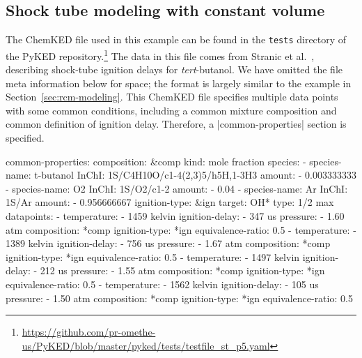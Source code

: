 \documentclass[12pt]{ijck}
\newcommand\ck{ChemKED}
\newcommand\pk{PyKED}
\begin{document}
\subsection{Shock tube modeling with constant volume}\label{sec:shock-tube}

The \ck{} file used in this example can be found in the \texttt{tests} directory of the \pk{}
repository.\footnote{\url{https://github.com/pr-omethe-us/PyKED/blob/master/pyked/tests/testfile_st_p5.yaml}}
The data in this file comes from Stranic et al.~\autocite{Stranic:2012}, describing
shock-tube ignition delays for \textit{tert}-butanol. We have omitted the file
meta information below for space; the format is largely similar to the example in Section~\ref{sec:rcm-modeling}.
%
This \ck{} file specifies multiple data points with some common
conditions, including a common mixture composition and common definition of
ignition delay. Therefore, a \yabox|common-properties| section is specified.
%
\begin{yamlbox}
common-properties:
  composition: &comp
    kind: mole fraction
    species:
      - species-name: t-butanol
        InChI: 1S/C4H10O/c1-4(2,3)5/h5H,1-3H3
        amount:
          - 0.003333333
      - species-name: O2
        InChI:  1S/O2/c1-2
        amount:
          - 0.04
      - species-name: Ar
        InChI:  1S/Ar
        amount:
          - 0.956666667
  ignition-type: &ign
    target: OH*
    type: 1/2 max
datapoints:
  - temperature:
      - 1459 kelvin
    ignition-delay:
      - 347 us
    pressure:
      - 1.60 atm
    composition: *comp
    ignition-type: *ign
    equivalence-ratio: 0.5
  - temperature:
      - 1389 kelvin
    ignition-delay:
      - 756 us
    pressure:
      - 1.67 atm
    composition: *comp
    ignition-type: *ign
    equivalence-ratio: 0.5
  - temperature:
      - 1497 kelvin
    ignition-delay:
      - 212 us
    pressure:
      - 1.55 atm
    composition: *comp
    ignition-type: *ign
    equivalence-ratio: 0.5
  - temperature:
      - 1562 kelvin
    ignition-delay:
      - 105 us
    pressure:
      - 1.50 atm
    composition: *comp
    ignition-type: *ign
    equivalence-ratio: 0.5
\end{yamlbox}
\end{document}
